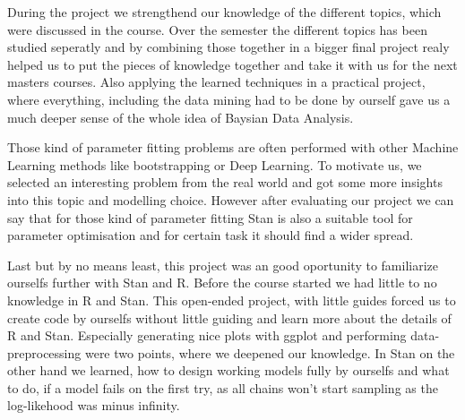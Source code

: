 \documentclass[
]{article}
\begin{document}
During the project we strengthend our knowledge of the different topics,
which were discussed in the course. Over the semester the different
topics has been studied seperatly and by combining those together in a
bigger final project realy helped us to put the pieces of knowledge
together and take it with us for the next masters courses. Also applying
the learned techniques in a practical project, where everything,
including the data mining had to be done by ourself gave us a much
deeper sense of the whole idea of Baysian Data Analysis.

Those kind of parameter fitting problems are often performed with other
Machine Learning methods like bootstrapping or Deep Learning. To
motivate us, we selected an interesting problem from the real world and
got some more insights into this topic and modelling choice. However
after evaluating our project we can say that for those kind of parameter
fitting Stan is also a suitable tool for parameter optimisation and for
certain task it should find a wider spread.

Last but by no means least, this project was an good oportunity to
familiarize ourselfs further with Stan and R. Before the course started
we had little to no knowledge in R and Stan. This open-ended project,
with little guides forced us to create code by ourselfs without little
guiding and learn more about the details of R and Stan. Especially
generating nice plots with ggplot and performing data-preprocessing were
two points, where we deepened our knowledge. In Stan on the other hand
we learned, how to design working models fully by ourselfs and what to
do, if a model fails on the first try, as all chains won't start
sampling as the log-likehood was minus infinity.


\end{document}
